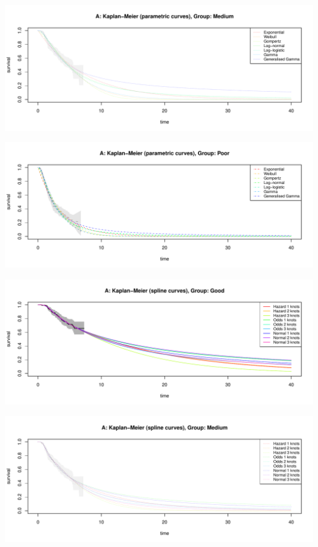 \documentclass[
]{article}
\begin{document}
\begin{flushleft}\includegraphics[height=0.29\textheight]{BC_OS_output/Images/Figure_validate_extrapolation_KM-2} \end{flushleft}

\begin{flushleft}\includegraphics[height=0.29\textheight]{BC_OS_output/Images/Figure_validate_extrapolation_KM-3} \end{flushleft}

\begin{flushleft}\includegraphics[height=0.29\textheight]{BC_OS_output/Images/Figure_validate_extrapolation_KM-4} \end{flushleft}

\begin{flushleft}\includegraphics[height=0.29\textheight]{BC_OS_output/Images/Figure_validate_extrapolation_KM-5} \end{flushleft}
\end{document}
